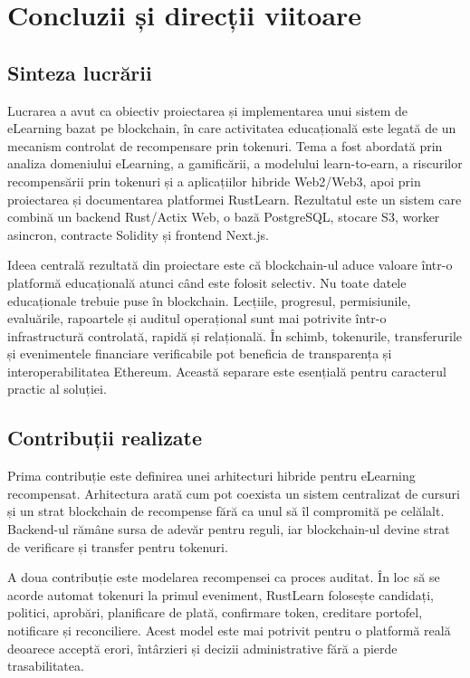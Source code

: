 \chapter{Concluzii și direcții viitoare}

\section{Sinteza lucrării}
Lucrarea a avut ca obiectiv proiectarea și implementarea unui sistem de eLearning bazat pe blockchain, în care activitatea educațională este legată de un mecanism controlat de recompensare prin tokenuri. Tema a fost abordată prin analiza domeniului eLearning, a gamificării, a modelului learn-to-earn, a riscurilor recompensării prin tokenuri și a aplicațiilor hibride Web2/Web3, apoi prin proiectarea și documentarea platformei RustLearn. Rezultatul este un sistem care combină un backend Rust/Actix Web, o bază PostgreSQL, stocare S3, worker asincron, contracte Solidity și frontend Next.js.

Ideea centrală rezultată din proiectare este că blockchain-ul aduce valoare într-o platformă educațională atunci când este folosit selectiv. Nu toate datele educaționale trebuie puse în blockchain. Lecțiile, progresul, permisiunile, evaluările, rapoartele și auditul operațional sunt mai potrivite într-o infrastructură controlată, rapidă și relațională. În schimb, tokenurile, transferurile și evenimentele financiare verificabile pot beneficia de transparența și interoperabilitatea Ethereum. Această separare este esențială pentru caracterul practic al soluției.

\section{Contribuții realizate}
Prima contribuție este definirea unei arhitecturi hibride pentru eLearning recompensat. Arhitectura arată cum pot coexista un sistem centralizat de cursuri și un strat blockchain de recompense fără ca unul să îl compromită pe celălalt. Backend-ul rămâne sursa de adevăr pentru reguli, iar blockchain-ul devine strat de verificare și transfer pentru tokenuri.

A doua contribuție este modelarea recompensei ca proces auditat. În loc să se acorde automat tokenuri la primul eveniment, RustLearn folosește candidați, politici, aprobări, planificare de plată, confirmare token, creditare portofel, notificare și reconciliere. Acest model este mai potrivit pentru o platformă reală deoarece acceptă erori, întârzieri și decizii administrative fără a pierde trasabilitatea.

